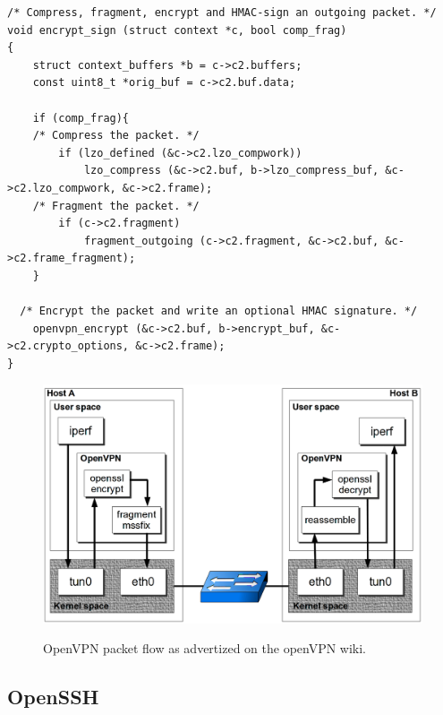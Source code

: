 \lstset{language=c}
\begin{lstlisting}[caption=openvpn compress then encrypt -- sample from \texttt{forward.c}, label=list:openvpn-workflow]
/* Compress, fragment, encrypt and HMAC-sign an outgoing packet. */
void encrypt_sign (struct context *c, bool comp_frag)
{
	struct context_buffers *b = c->c2.buffers;
	const uint8_t *orig_buf = c->c2.buf.data;

	if (comp_frag){
	/* Compress the packet. */
		if (lzo_defined (&c->c2.lzo_compwork))
			lzo_compress (&c->c2.buf, b->lzo_compress_buf, &c->c2.lzo_compwork, &c->c2.frame);
	/* Fragment the packet. */
		if (c->c2.fragment)
			fragment_outgoing (c->c2.fragment, &c->c2.buf, &c->c2.frame_fragment);
	}

  /* Encrypt the packet and write an optional HMAC signature. */
	openvpn_encrypt (&c->c2.buf, b->encrypt_buf, &c->c2.crypto_options, &c->c2.frame);
}
\end{lstlisting}

\begin{figure}[ht]
\includegraphics[width=\textwidth]{OpenVPN-packetflow}
\caption{OpenVPN packet flow as advertized on the openVPN wiki.}{}
\label{fig:openvpn-packet-flow}
\end{figure}


\subsection{OpenSSH}




